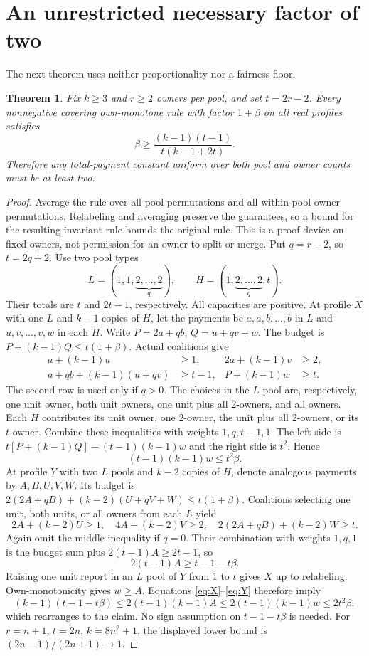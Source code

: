 \documentclass[11pt]{article}
\newtheorem{theorem}{Theorem}[section]
\theoremstyle{definition}\newtheorem{definition}[theorem]{Definition}
\theoremstyle{remark}\newtheorem{remark}[theorem]{Remark}
\begin{document}
\section{An unrestricted necessary factor of two}\label{sec:lower}
The next theorem uses neither proportionality nor a fairness floor.
\begin{theorem}\label{thm:unrestricted}
Fix $k\ge3$ and $r\ge2$ owners per pool, and set $t=2r-2$. Every
nonnegative covering own-monotone rule with factor $1+\beta$ on all real
profiles satisfies
\[
 \beta\ge\frac{(k-1)(t-1)}{t(k-1+2t)}.
\]
Therefore any total-payment constant uniform over both pool and owner counts
must be at least two.
\end{theorem}
\begin{proof}
Average the rule over all pool permutations and all within-pool owner
permutations. Relabeling and averaging preserve the guarantees, so a bound
for the resulting invariant rule bounds the original rule. This is a proof
device on fixed owners, not permission for an owner to split or merge.
Put $q=r-2$, so $t=2q+2$. Use two pool types
\[
 L=(1,1,\underbrace{2,\ldots,2}_{q}),\qquad
 H=(1,\underbrace{2,\ldots,2}_{q},t).
\]
Their totals are $t$ and $2t-1$, respectively. All capacities are positive.
At profile $X$ with one $L$ and $k-1$ copies of $H$, let the payments be
$a,a,b,\ldots,b$ in $L$ and $u,v,\ldots,v,w$ in each $H$. Write
$P=2a+qb$, $Q=u+qv+w$. The budget is $P+(k-1)Q\le t(1+\beta)$.
Actual coalitions give
\begin{align*}
 a+(k-1)u&\ge1, &2a+(k-1)v&\ge2,\\
 a+qb+(k-1)(u+qv)&\ge t-1, &P+(k-1)w&\ge t.
\end{align*}
The second row is used only if $q>0$. The choices in the $L$ pool are,
respectively, one unit owner, both unit owners, one unit plus all 2-owners,
and all owners. Each $H$ contributes its unit owner, one 2-owner, the unit
plus all 2-owners, or its $t$-owner. Combine these inequalities with weights
$1,q,t-1,1$. The left side is
$t[P+(k-1)Q]-(t-1)(k-1)w$ and the right side is $t^2$. Hence
\begin{equation}\label{eq:X}
 (t-1)(k-1)w\le t^2\beta.
\end{equation}
At profile $Y$ with two $L$ pools and $k-2$ copies of $H$, denote analogous
payments by $A,B,U,V,W$. Its budget is
$2(2A+qB)+(k-2)(U+qV+W)\le t(1+\beta)$. Coalitions selecting one unit,
both units, or all owners from each $L$ yield
\[
 2A+(k-2)U\ge1,\quad4A+(k-2)V\ge2,\quad
 2(2A+qB)+(k-2)W\ge t.
\]
Again omit the middle inequality if $q=0$. Their combination with weights
$1,q,1$ is the budget sum plus $2(t-1)A\ge2t-1$, so
\begin{equation}\label{eq:Y}
 2(t-1)A\ge t-1-t\beta.
\end{equation}
Raising one unit report in an $L$ pool of $Y$ from $1$ to $t$ gives $X$
up to relabeling. Own-monotonicity gives $w\ge A$. Equations
\eqref{eq:X}--\eqref{eq:Y} therefore imply
\[
 (k-1)(t-1-t\beta)\le2(t-1)(k-1)A
 \le2(t-1)(k-1)w\le2t^2\beta,
\]
which rearranges to the claim. No sign assumption on $t-1-t\beta$ is needed.
For $r=n+1$, $t=2n$, $k=8n^2+1$, the displayed lower bound is
$(2n-1)/(2n+1)\to1$.
\end{proof}
\end{document}
